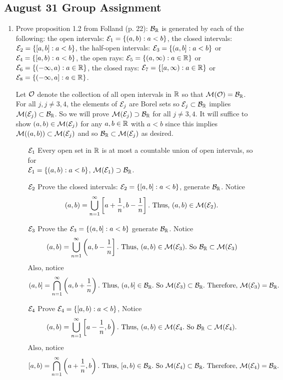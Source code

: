 \subsection{August 31 Group Assignment}
\begin{enumerate}
\item Prove proposition 1.2 from Folland (p. 22): ${\mathcal B}_{\mathbb R}$ is generated by each of the following:
 the open intervals: ${\mathcal E}_1 =\{ (a, b): a < b \} $,
 the closed intervals: ${\mathcal E}_2 = \{ [a,b]: a < b \}$, the half-open intervals: ${\mathcal E}_3 = \{ (a,b] : a < b \}$ or ${\mathcal E}_4 = \{ [a,b) : a < b \}$,
the open rays: ${\mathcal E}_5 = \{ (a,\infty) : a \in {\mathbb R}\}$ or ${\mathcal E}_6 = \{ (-\infty, a) : a \in {\mathbb R}\}$,
the closed rays: ${\mathcal E}_7 = \{ [a,\infty) : a \in {\mathbb R}\}$ or ${\mathcal E}_8 = \{ (-\infty, a] : a \in {\mathbb R}\}$.

\begin{pf}
Let ${\mathcal O}$ denote the collection of all open intervals in ${\mathbb R}$ so that ${\mathcal M}({\mathcal O})={\mathcal B}_{\mathbb R}$. For all $j, j\neq 3,4$, the elements of ${\mathcal E}_j$ are Borel sets so ${\mathcal E}_j \subset {\mathcal B}_{\mathbb R}$ implies ${\mathcal M}({\mathcal E}_j) \subset {\mathcal B}_{\mathbb R}$. So we will prove ${\mathcal M}({\mathcal E}_j) \supset {\mathcal B}_{\mathbb R}$ for all $j \neq 3,4$. It will suffice to show $(a,b) \in {\mathcal M}({\mathcal E}_j)$ for any $a, b \in {\mathbb R}$ with $a < b$ since this implies ${\mathcal M}((a,b)) \subset {\mathcal M}({\mathcal E}_j)$ and so ${\mathcal B}_{\mathbb R} \subset {\mathcal M}({\mathcal E}_j)$ as desired.\\
	\begin{enumerate}
\item[${\mathcal E}_1$] Every open set in ${\mathbb R}$ is at most a countable union of open intervals, so for \\ ${\mathcal E}_1 =\{ (a, b): a < b \} $, ${\mathcal M}({\mathcal E}_1) \supset {\mathcal B}_{\mathbb R}$. 
\item[${\mathcal E}_2$] Prove the closed intervals: ${\mathcal E}_2 = \{ [a,b]: a < b \}$, generate ${\mathcal B}_{\mathbb R}$. Notice 
\[ (a,b)=\bigcup_{n=1}^\infty \left[a + \frac{1}{n}, b-\frac{1}{n} \right]. \text{ Thus, } (a,b) \in {\mathcal M}({\mathcal E}_2).
\]
\item[${\mathcal E}_3$] Prove the ${\mathcal E}_3 = \{ (a,b] : a < b \}$ generate ${\mathcal B}_{\mathbb R}$. Notice 
\[ (a,b)=\bigcup_{n=1}^\infty \left(a, b-\frac{1}{n} \right]. \text{ Thus, } (a,b) \in {\mathcal M}({\mathcal E}_3). \text{ So } {\mathcal B}_{\mathbb R} \subset {\mathcal M}({\mathcal E}_3)
\]
Also, notice 
\[ (a,b]=\bigcap_{n=1}^\infty \left(a, b+\frac{1}{n} \right). \text{ Thus, } (a,b] \in {\mathcal B}_{\mathbb R}. \text{ So }  {\mathcal M}({\mathcal E}_3) \subset {\mathcal B}_{\mathbb R}. \text{ Therefore, } {\mathcal M}({\mathcal E}_3)={\mathcal B}_{\mathbb R}.
\]
\item[${\mathcal E}_4$] Prove ${\mathcal E}_4= \{ [a,b) : a < b \}$, Notice 
\[ (a,b)=\bigcup_{n=1}^\infty \left[a-\frac{1}{n}, b \right). \text{ Thus, } (a,b) \in {\mathcal M}({\mathcal E}_4. \text{ So } {\mathcal B}_{\mathbb R} \subset {\mathcal M}({\mathcal E}_4).
\]
Also, notice 
\[ [a,b)=\bigcap_{n=1}^\infty \left(a+\frac{1}{n}, b \right). \text{ Thus, } [a,b) \in {\mathcal B}_{\mathbb R}. \text{ So }  {\mathcal M}({\mathcal E}_4) \subset {\mathcal B}_{\mathbb R}. \text{ Therefore, } {\mathcal M}({\mathcal E}_4)={\mathcal B}_{\mathbb R}.
\]


\end{enumerate}
\end{pf}
\end{enumerate}
